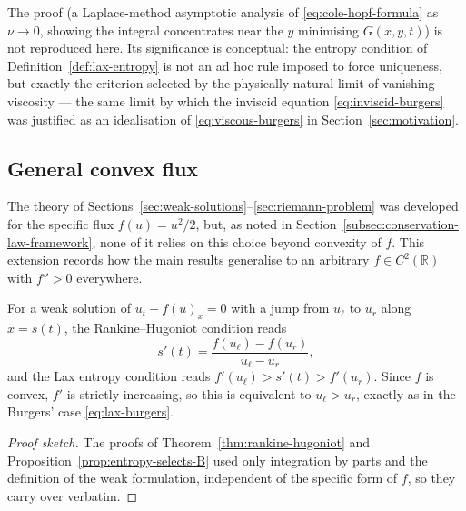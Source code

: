 The proof (a Laplace-method asymptotic analysis of
\eqref{eq:cole-hopf-formula} as $\nu\to0$, showing the integral
concentrates near the $y$ minimising $G(x,y,t)$) is not reproduced here.
Its significance is conceptual: the entropy condition of
Definition~\ref{def:lax-entropy} is not an ad hoc rule imposed to force
uniqueness, but exactly the criterion selected by the physically natural
limit of vanishing viscosity --- the same limit by which the inviscid
equation \eqref{eq:inviscid-burgers} was justified as an idealisation of
\eqref{eq:viscous-burgers} in Section~\ref{sec:motivation}.

\subsection{General convex flux}
\label{subsec:general-flux}

The theory of Sections~\ref{sec:weak-solutions}--\ref{sec:riemann-problem}
was developed for the specific flux $f(u)=u^2/2$, but, as noted in
Section~\ref{subsec:conservation-law-framework}, none of it relies on
this choice beyond convexity of $f$. This extension records how the main
results generalise to an arbitrary $f \in C^2(\mathbb{R})$ with
$f''>0$ everywhere.

\begin{proposition}
\label{prop:general-rh-lax}
For a weak solution of $u_t+f(u)_x=0$ with a jump from $u_\ell$ to $u_r$
along $x=s(t)$, the Rankine--Hugoniot condition reads
\begin{equation}
  \label{eq:general-rh}
  s'(t) = \frac{f(u_\ell)-f(u_r)}{u_\ell-u_r},
\end{equation}
and the Lax entropy condition reads $f'(u_\ell) > s'(t) > f'(u_r)$. Since
$f$ is convex, $f'$ is strictly increasing, so this is equivalent to
$u_\ell > u_r$, exactly as in the Burgers' case \eqref{eq:lax-burgers}.
\end{proposition}

\begin{proof}[Proof sketch]
The proofs of Theorem~\ref{thm:rankine-hugoniot} and
Proposition~\ref{prop:entropy-selects-B} used only integration by parts
and the definition of the weak formulation, independent of the specific
form of $f$, so they carry over verbatim.
\end{proof}


